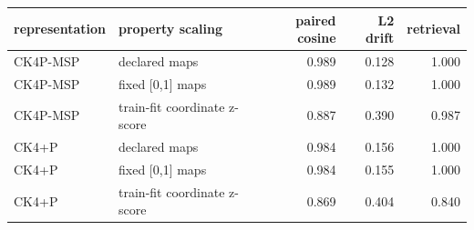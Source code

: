 \begin{tabular}{@{}llrrr@{}}
\toprule
\textbf{representation} & \textbf{property scaling} & \textbf{paired cosine} & \textbf{L2 drift} & \textbf{retrieval} \\
\midrule
CK4P-MSP & declared maps & 0.989 & 0.128 & 1.000 \\
CK4P-MSP & fixed [0,1] maps & 0.989 & 0.132 & 1.000 \\
CK4P-MSP & train-fit coordinate z-score & 0.887 & 0.390 & 0.987 \\
CK4+P & declared maps & 0.984 & 0.156 & 1.000 \\
CK4+P & fixed [0,1] maps & 0.984 & 0.155 & 1.000 \\
CK4+P & train-fit coordinate z-score & 0.869 & 0.404 & 0.840 \\
\bottomrule
\end{tabular}
